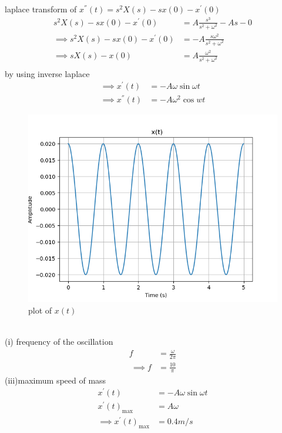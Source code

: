 \documentclass[journal,12pt,twocolumn]{IEEEtran}
\theoremstyle{remark}
\begin{document}
laplace transform of  $x^{''}(t)=s^2X(s)-sx(0)-x^{'}(0)$
\begin{align}
s^2X(s)-sx(0)-x^{'}(0)&=A\frac{s^3}{s^2+\omega^2}-As-0\\
\implies s^2X(s)-sx(0)-x^{'}(0)&=-A\frac{s\omega^2}{s^2+\omega^2}\\
\implies sX(s)-x(0)&=A\frac{\omega^2}{s^2+\omega^2}\\
\end{align}
by using inverse laplace
\begin{align}
\implies x^{'}(t)&=-A\omega\sin{\omega t}\\
\implies x^{''}(t)&=-A\omega^2 \cos{wt}
\end{align}
\begin{figure}[h!]
    \centering
    \includegraphics[width=1.1\linewidth]{figs/analog1.png}
    \caption{plot of $x(t)$}
\end{figure}\\
(i) frequency of the oscillation
\begin{align}
    f&=\frac{\omega}{2\pi}\\\
    \implies f&=\frac{10}{\pi}
\end{align}
(iii)maximum speed of mass\\
\begin{align}
    x^{'}(t)&=-A\omega\sin{\omega t}\\
  x^{'}(t)_{\text{max}}&=A\omega\\
    \implies x^{'}(t)_{\text{max}} &= 0.4 m/s
\end{align}
\end{document}
